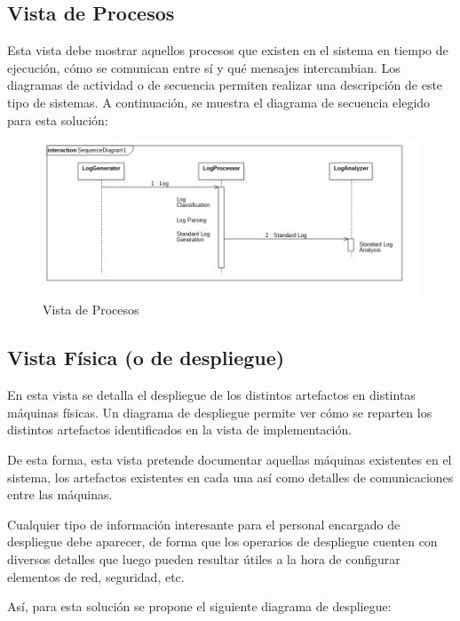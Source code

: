 \documentclass[11pt]{article}
\begin{document}
\subsection{Vista de Procesos}
Esta vista debe mostrar aquellos procesos que existen en el sistema en tiempo de ejecución, cómo se comunican entre sí y qué mensajes intercambian. Los diagramas de actividad o de secuencia permiten realizar una descripción de este tipo de sistemas. A continuación, se muestra el diagrama de secuencia elegido para esta solución:

\begin{center}
 \begin{figure}[H]
 \begin{center}
   \includegraphics[width=16cm]{img/process_view00.png}
   \caption{Vista de Procesos}
   \label{fig:4plus1views}
 \end{center}
 \end{figure}
\end{center}

\subsection{Vista Física (o de despliegue)}
En esta vista se detalla el despliegue de los distintos artefactos en distintas máquinas físicas. Un diagrama de despliegue permite ver cómo se reparten los distintos artefactos identificados en la vista de implementación.

De esta forma, esta vista pretende documentar aquellas máquinas existentes en el sistema, los artefactos existentes en cada una así como detalles de comunicaciones entre las máquinas.

Cualquier tipo de información interesante para el personal encargado de despliegue debe aparecer, de forma que los operarios de despliegue cuenten con diversos detalles que luego pueden resultar útiles a la hora de configurar elementos de red, seguridad, etc.

Así, para esta solución se propone el siguiente diagrama de despliegue:
\end{document}

